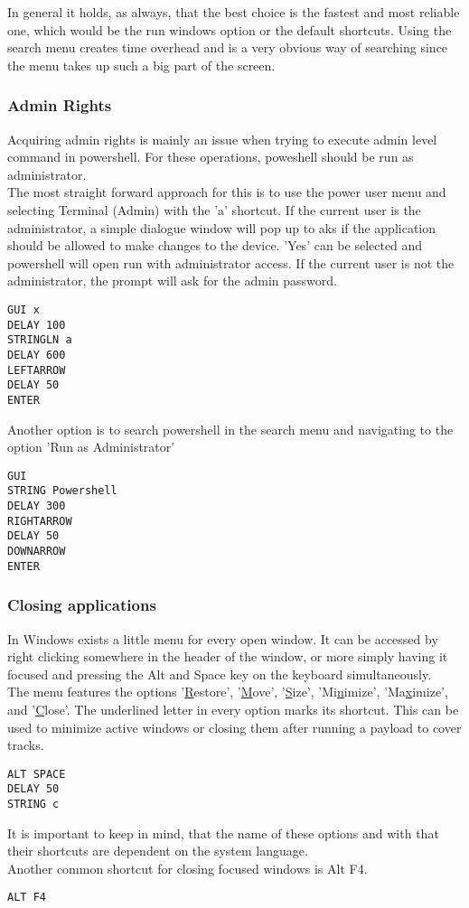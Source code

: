 In general it holds, as always, that the best choice is the fastest and most reliable one, which would be the run windows option or the default shortcuts. Using the search menu creates time overhead and is a very obvious way of searching since the menu takes up such a big part of the screen. 

\subsubsection{Admin Rights}

Acquiring admin rights is mainly an issue when trying to execute admin level command in powershell. For these operations, poweshell should be run as administrator. \\
The most straight forward approach for this is to use the power user menu and selecting Terminal (Admin) with the 'a' shortcut. If the current user is the administrator, a simple dialogue window will pop up to aks if the application should be allowed to make changes to the device. 'Yes' can be selected and powershell will open run with administrator access. If the current user is not the administrator, the prompt will ask for the admin password. \\
\begin{lstlisting}
GUI x
DELAY 100
STRINGLN a
DELAY 600
LEFTARROW
DELAY 50
ENTER
\end{lstlisting}

Another option is to search powershell in the search menu and navigating to the option 'Run as Administrator' \\
\begin{lstlisting}
GUI
STRING Powershell
DELAY 300
RIGHTARROW
DELAY 50
DOWNARROW
ENTER
\end{lstlisting}

\subsubsection{Closing applications}

In Windows exists a little menu for every open window. It can be accessed by right clicking somewhere in the header of the window, or more simply having it focused and pressing the Alt and Space key on the keyboard simultaneously. \\
The menu features the options '\underline{R}estore', '\underline{M}ove', '\underline{S}ize', 'Mi\underline{n}imize', 'Ma\underline{x}imize', and '\underline{C}lose'. The underlined letter in every option marks its shortcut. This can be used to minimize active windows or closing them after running a payload to cover tracks.
\begin{lstlisting}
ALT SPACE
DELAY 50
STRING c
\end{lstlisting}
It is important to keep in mind, that the name of these options and with that their shortcuts are dependent on the system language. \\
Another common shortcut for closing focused windows is Alt F4.
\begin{lstlisting}
ALT F4
\end{lstlisting}
\\

